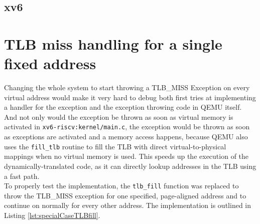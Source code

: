 

\subsection{xv6}







\section{TLB miss handling for a single fixed address}

Changing the whole system to start throwing a TLB\_MISS Exception on every virtual address would
make it very hard to debug both first tries at implementing a handler for the exception and the
exception throwing code in QEMU itself.
And not only would the exception be thrown as soon as virtual memory is activated in
\texttt{xv6-riscv:kernel/main.c}, the exception would be thrown
as soon as exceptions are activated and a memory access happens, because QEMU also uses the
\texttt{fill\_tlb} routine to fill the TLB with direct
virtual-to-physical mappings when no virtual memory is used. This speeds up the execution of
the dynamically-translated code, as it can directly
lookup addresses in the TLB using a fast path.\\ 
To properly test the implementation, the \texttt{tlb\_fill} function was replaced to throw the
TLB\_MISS exception for
one specified, page-aligned address and to continue on normally for every other address.
The implementation is outlined
in Listing \ref{lst:specialCaseTLBfill}.


